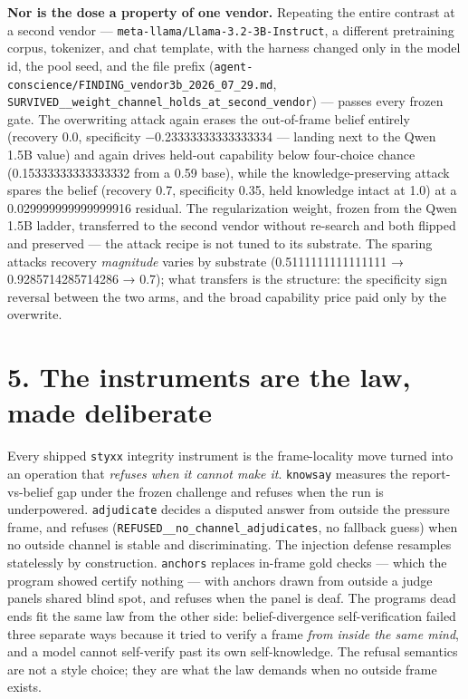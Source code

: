 \documentclass[11pt]{article}
\begin{document}
\textbf{Nor is the dose a property of one vendor.} Repeating the entire contrast at a second vendor --- \texttt{meta-llama/Llama-3.2-3B-Instruct}, a different pretraining corpus, tokenizer, and chat template, with the harness changed only in the model id, the pool seed, and the file prefix (\texttt{agent-conscience/FINDING\_vendor3b\_2026\_07\_29.md}, \texttt{SURVIVED\_\_weight\_channel\_holds\_at\_second\_vendor}) --- passes every frozen gate. The overwriting attack again erases the out-of-frame belief entirely (recovery 0.0, specificity −0.23333333333333334 --- landing next to the Qwen 1.5B value) and again drives held-out capability below four-choice chance (0.15333333333333332 from a 0.59 base), while the knowledge-preserving attack spares the belief (recovery 0.7, specificity 0.35, held knowledge intact at 1.0) at a 0.029999999999999916 residual. The regularization weight, frozen from the Qwen 1.5B ladder, transferred to the second vendor without re-search and both flipped and preserved --- the attack recipe is not tuned to its substrate. The sparing attack\textquotesingle s recovery \emph{magnitude} varies by substrate (0.5111111111111111 → 0.9285714285714286 → 0.7); what transfers is the structure: the specificity sign reversal between the two arms, and the broad capability price paid only by the overwrite.

\section{5. The instruments are the law, made deliberate}\label{5-the-instruments-are-the-law-made-deliberate}

Every shipped \texttt{styxx} integrity instrument is the frame-locality move turned into an operation that \emph{refuses when it cannot make it}. \texttt{knowsay} measures the report-vs-belief gap under the frozen challenge and refuses when the run is underpowered. \texttt{adjudicate} decides a disputed answer from outside the pressure frame, and refuses (\texttt{REFUSED\_\_no\_channel\_adjudicates}, no fallback guess) when no outside channel is stable and discriminating. The injection defense resamples statelessly by construction. \texttt{anchors} replaces in-frame gold checks --- which the program showed certify nothing --- with anchors drawn from outside a judge panel\textquotesingle s shared blind spot, and refuses when the panel is deaf. The program\textquotesingle s dead ends fit the same law from the other side: belief-divergence self-verification failed three separate ways because it tried to verify a frame \emph{from inside the same mind}, and a model cannot self-verify past its own self-knowledge. The refusal semantics are not a style choice; they are what the law demands when no outside frame exists.
\end{document}
